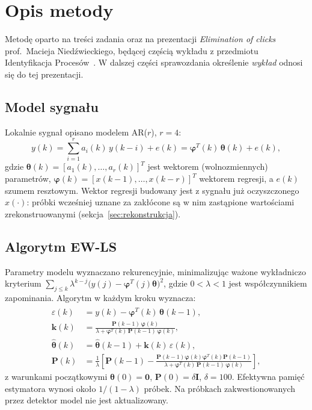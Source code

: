 \documentclass[11pt,a4paper]{article}
\begin{document}
\section{Opis metody}

Metodę oparto na treści zadania oraz na prezentacji \emph{Elimination of
clicks} prof.~Macieja Niedźwieckiego, będącej częścią wykładu z przedmiotu
Identyfikacja Procesów~\cite{wyklad}. W dalszej części sprawozdania
określenie \emph{wykład} odnosi się do tej prezentacji.

\subsection{Model sygnału}
\label{sec:model}

Lokalnie sygnał opisano modelem AR($r$), $r=4$:
\begin{equation}
  y(k) = \sum_{i=1}^{r} a_i(k)\, y(k-i) + e(k)
       = \boldsymbol{\varphi}^{T}(k)\,\boldsymbol{\theta}(k) + e(k),
\end{equation}
gdzie
$\boldsymbol{\theta}(k) = [a_1(k), \dots, a_r(k)]^T$ jest wektorem
(wolnozmiennych) parametrów,
$\boldsymbol{\varphi}(k) = [x(k-1), \dots, x(k-r)]^T$ wektorem regresji,
a $e(k)$ szumem resztowym. Wektor regresji budowany jest z sygnału już
oczyszczonego $x(\cdot)$: próbki wcześniej uznane za zakłócone są w nim
zastąpione wartościami zrekonstruowanymi (sekcja~\ref{sec:rekonstrukcja}).

\subsection{Algorytm EW-LS}
\label{sec:ewls}

Parametry modelu wyznaczano rekurencyjnie, minimalizując ważone
wykładniczo kryterium
$\sum_{j\le k} \lambda^{k-j}\big(y(j)-\boldsymbol{\varphi}^T(j)\boldsymbol{\theta}\big)^2$,
gdzie $0<\lambda<1$ jest współczynnikiem zapominania. Algorytm w każdym
kroku wyznacza:
\begin{align}
  \varepsilon(k) &= y(k) - \boldsymbol{\varphi}^T(k)\,\hat{\boldsymbol{\theta}}(k-1),
     \label{eq:err}\\
  \mathbf{k}(k) &= \frac{\mathbf{P}(k-1)\,\boldsymbol{\varphi}(k)}
                        {\lambda + \boldsymbol{\varphi}^T(k)\,\mathbf{P}(k-1)\,\boldsymbol{\varphi}(k)},\\
  \hat{\boldsymbol{\theta}}(k) &= \hat{\boldsymbol{\theta}}(k-1) + \mathbf{k}(k)\,\varepsilon(k),\\
  \mathbf{P}(k) &= \frac{1}{\lambda}\left[\mathbf{P}(k-1) -
     \frac{\mathbf{P}(k-1)\boldsymbol{\varphi}(k)\boldsymbol{\varphi}^T(k)\mathbf{P}(k-1)}
          {\lambda + \boldsymbol{\varphi}^T(k)\,\mathbf{P}(k-1)\,\boldsymbol{\varphi}(k)}\right],
\end{align}
z warunkami początkowymi $\hat{\boldsymbol{\theta}}(0)=\mathbf{0}$,
$\mathbf{P}(0) = \delta \mathbf{I}$, $\delta = 100$. Efektywna pamięć
estymatora wynosi około $1/(1-\lambda)$ próbek. Na próbkach zakwestionowanych
przez detektor model nie jest aktualizowany.
\end{document}
